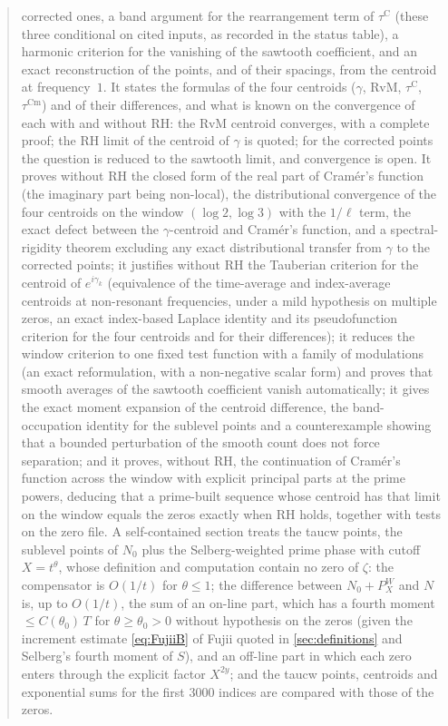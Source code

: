 \documentclass[11pt,a4paper]{article}
\numberwithin{equation}{section}
\theoremstyle{definition}
\theoremstyle{remark}
\newcommand{\Cm}{\mathrm{Cm}}
\begin{document}
\begin{abstract}
corrected ones, a band argument for the rearrangement term of $\tau^{\mathrm C}$ (these three conditional on cited inputs, as recorded in the status table), a harmonic criterion for the vanishing of the sawtooth
coefficient, and an exact reconstruction of the points, and of their
spacings, from the centroid at frequency~$1$. It states the formulas of the four centroids
($\gamma$, RvM, $\tau^{\mathrm C}$, $\tau^{\Cm}$) and of their differences, and what is known on the
convergence of each with and without RH: the RvM centroid converges, with a complete proof; the RH limit of the centroid of $\gamma$ is quoted; for the corrected points the question is reduced to the sawtooth limit, and convergence is open. It proves without RH the closed form of the real part of Cram\'er's function (the imaginary part being non-local), the distributional convergence of the four centroids on the window $(\log2,\log3)$ with the $1/\ell$ term, the exact defect between the $\gamma$-centroid and Cram\'er's function, and a spectral-rigidity theorem excluding any exact distributional transfer from $\gamma$ to the corrected points; it justifies without RH the Tauberian criterion for the centroid of $e^{i\gamma_k}$ (equivalence of the time-average and index-average centroids at non-resonant frequencies, under a mild hypothesis on multiple zeros, an exact index-based Laplace identity and its pseudofunction criterion for the four centroids and for their differences); it reduces the window criterion to one fixed test function with a family of modulations (an exact reformulation, with a non-negative scalar form) and proves that smooth averages of the sawtooth coefficient vanish automatically; it gives the exact moment expansion of the centroid difference, the band-occupation identity for the sublevel points and a counterexample showing that a bounded perturbation of the smooth count does not force separation; and it proves, without RH, the continuation of Cram\'er's function across the window with explicit principal parts at the prime powers, deducing that a prime-built sequence whose centroid has that limit on the window equals the zeros exactly when RH holds, together with tests on the zero file.
A self-contained section treats the taucw points, the sublevel points of $N_0$ plus the Selberg-weighted prime phase with cutoff $X=t^\theta$, whose definition and computation contain no zero of $\zeta$: the compensator is $O(1/t)$ for $\theta\le1$; the difference between $N_0+P_X^W$ and $N$ is, up to $O(1/t)$, the sum of an on-line part, which has a fourth moment $\le C(\theta_0)\,T$ for $\theta\ge\theta_0>0$ without hypothesis on the zeros (given the increment estimate \eqref{eq:FujiiB} of Fujii quoted in \cref{sec:definitions} and Selberg's fourth moment of $S$), and an off-line part in which each zero enters through the explicit factor $X^{2y}$; and the taucw points, centroids and exponential sums for the first $3000$ indices are compared with those of the zeros.

\end{abstract}
\end{document}
